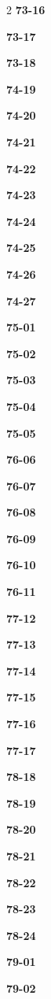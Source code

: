 \documentclass[10pt,a4paper]{article}
\begin{document}
\begin{multicols}{2}
\noindent\textbf{73-16}\ \par
\noindent\textbf{73-17}\ \par
\noindent\textbf{73-18}\ \par
\noindent\textbf{74-19}\ \par
\noindent\textbf{74-20}\ \par
\noindent\textbf{74-21}\ \par
\noindent\textbf{74-22}\ \par
\noindent\textbf{74-23}\ \par
\noindent\textbf{74-24}\ \par
\noindent\textbf{74-25}\ \par
\noindent\textbf{74-26}\ \par
\noindent\textbf{74-27}\ \par
\noindent\textbf{75-01}\ \par
\noindent\textbf{75-02}\ \par
\noindent\textbf{75-03}\ \par
\noindent\textbf{75-04}\ \par
\noindent\textbf{75-05}\ \par
\noindent\textbf{76-06}\ \par
\noindent\textbf{76-07}\ \par
\noindent\textbf{76-08}\ \par
\noindent\textbf{76-09}\ \par
\noindent\textbf{76-10}\ \par
\noindent\textbf{76-11}\ \par
\noindent\textbf{77-12}\ \par
\noindent\textbf{77-13}\ \par
\noindent\textbf{77-14}\ \par
\noindent\textbf{77-15}\ \par
\noindent\textbf{77-16}\ \par
\noindent\textbf{77-17}\ \par
\noindent\textbf{78-18}\ \par
\noindent\textbf{78-19}\ \par
\noindent\textbf{78-20}\ \par
\noindent\textbf{78-21}\ \par
\noindent\textbf{78-22}\ \par
\noindent\textbf{78-23}\ \par
\noindent\textbf{78-24}\ \par
\noindent\textbf{79-01}\ \par
\noindent\textbf{79-02}\ \par

\end{multicols}
\end{document}
